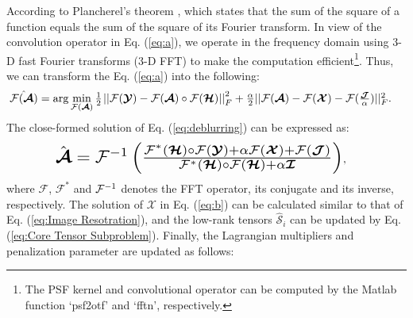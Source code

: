 \documentclass[twocolumn]{svjour3}          %
\begin{document}
    According to Plancherel's theorem \cite{bracewell1966fourier}, which states that the sum of the square of a function equals the sum of the square of its Fourier transform. In view of the convolution operator in Eq. (\ref{eq:a}), we operate in the frequency domain using 3-D fast Fourier transforms (3-D FFT) to make the computation efficient\footnote{The PSF kernel and convolutional operator can be computed by the Matlab function `psf2otf' and `fftn', respectively.}. Thus, we can transform the  Eq. (\ref{eq:a}) into the following:
    \begin{equation}\label{eq:deblurring}
    \begin{aligned}
    &\resizebox{0.99\hsize}{!}{$\hat{{\mathcal{F}}({\boldsymbol{\mathcal{A}}})} = \arg \mathop {\min }\limits_{{\mathcal{F}}({\boldsymbol{\mathcal{A}}})} \frac{1}{2}{\kern 1pt} {\rm{||}}{\mathcal{F}}({\boldsymbol{\mathcal{Y}}}) - {\mathcal{F}}({\boldsymbol{\mathcal{A}}}) \circ {\mathcal{F}}({\boldsymbol{\mathcal{H}}}){\rm{||}}_F^2 + \frac{\alpha }{2}||{\mathcal{F}}({\boldsymbol{\mathcal{A}}}) - {\mathcal{F}}({\boldsymbol{\mathcal{X}}}) - {\mathcal{F}}(\frac{{\boldsymbol{\mathcal{J}}}}{\alpha })||_F^2$}.
    \end{aligned}
    \end{equation}
    The close-formed solution of Eq. (\ref{eq:deblurring}) can be expressed as:
    \begin{equation}\label{eq:deblurring-solution}
    \begin{aligned}
    &\resizebox{0.75\hsize}{!}{$\hat {\boldsymbol{\mathcal{A}}} = {{\mathcal{F}}^{{\rm{ - }}1}}\left( {\frac{{{{\mathcal{F}}^ * }({\boldsymbol{\mathcal{H}}}) \circ {\mathcal{F}}({\boldsymbol{\mathcal{Y}}}) + \alpha {\mathcal{F}}({\boldsymbol{\mathcal{X}}}) + {\mathcal{F}}({\boldsymbol{\mathcal{J}}})}}{{{{\mathcal{F}}^ * }({\boldsymbol{\mathcal{H}}}) \circ {\mathcal{F}}({\boldsymbol{\mathcal{H}}}) + \alpha {\boldsymbol{\mathcal{I}}}}}} \right)$},
    \end{aligned}
    \end{equation}
    where ${\mathcal{F}}$, ${{\mathcal{F}}^ * }$ and ${{\mathcal{F}}^{{\rm{ - }}1}}$ denotes the FFT operator, its conjugate and its inverse, respectively. The solution of  ${\boldsymbol{\mathcal{X}}}$ in Eq. (\ref{eq:b}) can be calculated similar to that of Eq. (\ref{eq:Image Resotration}), and the low-rank tensors ${\hat{\boldsymbol{\mathcal{S}}}_i}$ can be updated by Eq. (\ref{eq:Core Tensor Subproblem}). Finally, the Lagrangian multipliers and penalization parameter are updated as follows:
\end{document}
